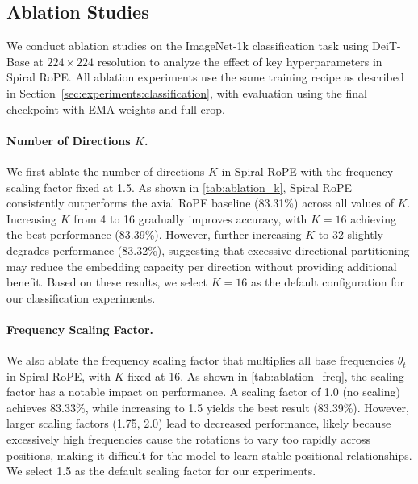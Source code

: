 \subsection{Ablation Studies}

We conduct ablation studies on the ImageNet-1k classification task using DeiT-Base at $224 \times 224$ resolution to analyze the effect of key hyperparameters in Spiral RoPE. All ablation experiments use the same training recipe as described in Section~\ref{sec:experiments:classification}, with evaluation using the final checkpoint with EMA weights and full crop.

\paragraph{Number of Directions $K$.} We first ablate the number of directions $K$ in Spiral RoPE with the frequency scaling factor fixed at 1.5. As shown in \cref{tab:ablation_k}, Spiral RoPE consistently outperforms the axial RoPE baseline (83.31\%) across all values of $K$. Increasing $K$ from 4 to 16 gradually improves accuracy, with $K=16$ achieving the best performance (83.39\%). However, further increasing $K$ to 32 slightly degrades performance (83.32\%), suggesting that excessive directional partitioning may reduce the embedding capacity per direction without providing additional benefit. Based on these results, we select $K=16$ as the default configuration for our classification experiments.

\paragraph{Frequency Scaling Factor.} We also ablate the frequency scaling factor that multiplies all base frequencies $\theta_t$ in Spiral RoPE, with $K$ fixed at 16. As shown in \cref{tab:ablation_freq}, the scaling factor has a notable impact on performance. A scaling factor of 1.0 (no scaling) achieves 83.33\%, while increasing to 1.5 yields the best result (83.39\%). However, larger scaling factors (1.75, 2.0) lead to decreased performance, likely because excessively high frequencies cause the rotations to vary too rapidly across positions, making it difficult for the model to learn stable positional relationships. We select 1.5 as the default scaling factor for our experiments.

